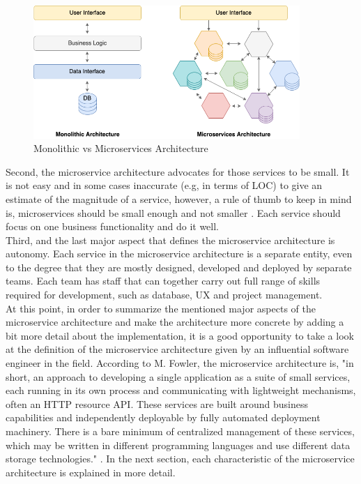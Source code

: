 \documentclass{Configuration_Files/PoliMi3i_thesis}
\begin{document}
\begin{figure}[H]
    \centering
    \includegraphics[width=0.9\textwidth]{myImages/monovsmicro.png}
    \caption{Monolithic vs Microservices Architecture}
    \label{fig:monovsmicro}
\end{figure}

Second, the microservice architecture advocates for those services to be small.
It is not easy and in some cases inaccurate (e.g, in terms of LOC) to give an estimate of the magnitude of a service, however, a rule of thumb to keep in mind is, microservices should be small enough and not smaller \cite{newman}.
Each service should focus on one business functionality and do it well.
\\
Third, and the last major aspect that defines the microservice architecture is autonomy.
Each service in the microservice architecture is a separate entity, even to the degree that they are mostly designed, developed and deployed by separate teams.
Each team has staff that can together carry out full range of skills required for development, such as database, UX and project management.
\\
At this point, in order to summarize the mentioned major aspects of the microservice architecture and make the architecture more concrete by adding a bit more detail about the implementation, it is a good opportunity to take a look at the definition of the microservice architecture given by an influential software engineer in the field.
According to M. Fowler, the microservice architecture is, "in short, an approach to developing a single application as a suite of small services, each running in its own process and communicating with lightweight mechanisms, often an HTTP resource API.
These services are built around business capabilities and independently deployable by fully automated deployment machinery.
There is a bare minimum of centralized management of these services, which may be written in different programming languages and use different data storage technologies." \cite{microdef}.
In the next section, each characteristic of the microservice architecture is explained in more detail.
\end{document}
